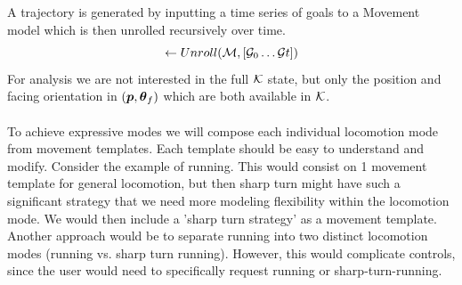 A trajectory is generated by inputting a time series of goals to a Movement model which is then unrolled recursively over time.
\begin{equation}
    [\kine_0 \ldots \kine_t] \leftarrow Unroll(\model,[\goals_{0} \dots \goals{t}])
\end{equation}
For analysis we are not interested in the full $\mathcal{K}$ state, but only the position and facing orientation in $(\boldsymbol{p }, \boldsymbol{\theta }_f)$ which are both available in $\mathcal{K}$. 
\\\\
To achieve expressive modes we will compose each individual locomotion mode from movement templates. Each template should be easy to understand and modify. Consider the example of running. This would consist on 1 movement template for general locomotion, but then sharp turn might have such a significant strategy that we need more modeling flexibility within the locomotion mode. We would then include a 'sharp turn strategy' as a movement template. Another approach would be to separate running into two distinct locomotion modes (running vs. sharp turn running). However, this would complicate controls, since the user would need to specifically request running or sharp-turn-running. 


